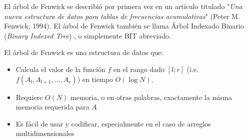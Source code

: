 El árbol de Fenwick se describió por primera vez en un artículo titulado "\emph{Una nueva estructura de datos para tablas de frecuencias acumulativas}" (Peter M. Fenwick, 1994). El árbol de Fenwick también se llama Árbol Indexado Binario (\emph{Binary Indexed Tree}) , o simplemente BIT abreviado.

El árbol de Fenwick es una estructura de datos que:

\begin{itemize}
	\item Calcula el valor de la función $f$ en el rango dado $[l;r]$ (i.e. $f(A_l, A_{l+1},\dots,A_r)$) en tiempo $O(\log N)$.
	\item Requiere $O(N)$ memoria, o en otras palabras, exactamente la misma memoria requerida para $A$
	\item Es fácil de usar y codificar, especialmente en el caso de arreglos multidimensionales
\end{itemize}